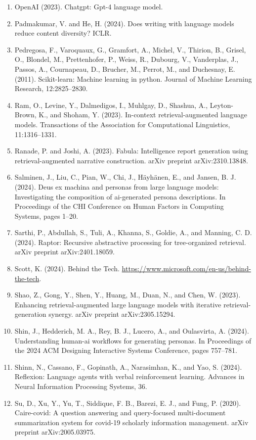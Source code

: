 \documentclass[11pt,UTF8,fontset=fandol]{ctexart}
\begin{document}
\begin{enumerate}[leftmargin=2em]
\item OpenAI (2023). Chatgpt: Gpt-4 language model.
\item Padmakumar, V. and He, H. (2024). Does writing with language models reduce content diversity? ICLR.
\item Pedregosa, F., Varoquaux, G., Gramfort, A., Michel, V., Thirion, B., Grisel, O., Blondel, M., Prettenhofer, P., Weiss, R., Dubourg, V., Vanderplas, J., Passos, A., Cournapeau, D., Brucher, M., Perrot, M., and Duchesnay, E. (2011). Scikit-learn: Machine learning in python. Journal of Machine Learning Research, 12:2825--2830.
\item Ram, O., Levine, Y., Dalmedigos, I., Muhlgay, D., Shashua, A., Leyton-Brown, K., and Shoham, Y. (2023). In-context retrieval-augmented language models. Transactions of the Association for Computational Linguistics, 11:1316--1331.
\item Ranade, P. and Joshi, A. (2023). Fabula: Intelligence report generation using retrieval-augmented narrative construction. arXiv preprint arXiv:2310.13848.
\item Salminen, J., Liu, C., Pian, W., Chi, J., H\"ayh\"anen, E., and Jansen, B. J. (2024). Deus ex machina and personas from large language models: Investigating the composition of ai-generated persona descriptions. In Proceedings of the CHI Conference on Human Factors in Computing Systems, pages 1--20.
\item Sarthi, P., Abdullah, S., Tuli, A., Khanna, S., Goldie, A., and Manning, C. D. (2024). Raptor: Recursive abstractive processing for tree-organized retrieval. arXiv preprint arXiv:2401.18059.
\item Scott, K. (2024). Behind the Tech. \url{https://www.microsoft.com/en-us/behind-the-tech}.
\item Shao, Z., Gong, Y., Shen, Y., Huang, M., Duan, N., and Chen, W. (2023). Enhancing retrieval-augmented large language models with iterative retrieval-generation synergy. arXiv preprint arXiv:2305.15294.
\item Shin, J., Hedderich, M. A., Rey, B. J., Lucero, A., and Oulasvirta, A. (2024). Understanding human-ai workflows for generating personas. In Proceedings of the 2024 ACM Designing Interactive Systems Conference, pages 757--781.
\item Shinn, N., Cassano, F., Gopinath, A., Narasimhan, K., and Yao, S. (2024). Reflexion: Language agents with verbal reinforcement learning. Advances in Neural Information Processing Systems, 36.
\item Su, D., Xu, Y., Yu, T., Siddique, F. B., Barezi, E. J., and Fung, P. (2020). Caire-covid: A question answering and query-focused multi-document summarization system for covid-19 scholarly information management. arXiv preprint arXiv:2005.03975.

\end{enumerate}
\end{document}
